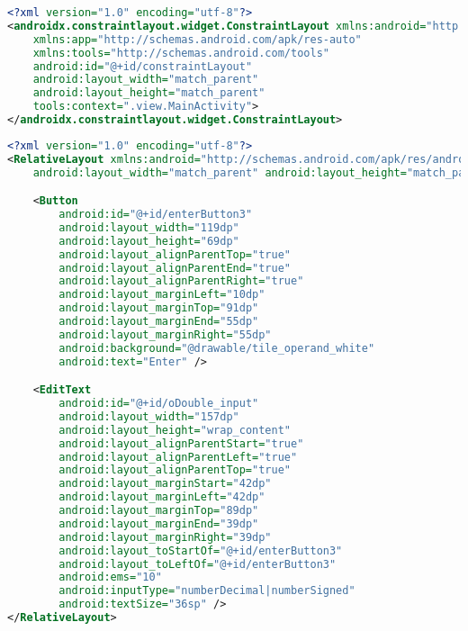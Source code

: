\begin{lstlisting}[caption=activity\_main.xml,label=list:activity_main.xml,language=XML]
<?xml version="1.0" encoding="utf-8"?>
<androidx.constraintlayout.widget.ConstraintLayout xmlns:android="http://schemas.android.com/apk/res/android"
    xmlns:app="http://schemas.android.com/apk/res-auto"
    xmlns:tools="http://schemas.android.com/tools"
    android:id="@+id/constraintLayout"
    android:layout_width="match_parent"
    android:layout_height="match_parent"
    tools:context=".view.MainActivity">
</androidx.constraintlayout.widget.ConstraintLayout>
\end{lstlisting} 

\begin{lstlisting}[caption=input\_double.xml,label=list:input_double.xml,language=XML]
<?xml version="1.0" encoding="utf-8"?>
<RelativeLayout xmlns:android="http://schemas.android.com/apk/res/android"
    android:layout_width="match_parent" android:layout_height="match_parent">

    <Button
        android:id="@+id/enterButton3"
        android:layout_width="119dp"
        android:layout_height="69dp"
        android:layout_alignParentTop="true"
        android:layout_alignParentEnd="true"
        android:layout_alignParentRight="true"
        android:layout_marginLeft="10dp"
        android:layout_marginTop="91dp"
        android:layout_marginEnd="55dp"
        android:layout_marginRight="55dp"
        android:background="@drawable/tile_operand_white"
        android:text="Enter" />

    <EditText
        android:id="@+id/oDouble_input"
        android:layout_width="157dp"
        android:layout_height="wrap_content"
        android:layout_alignParentStart="true"
        android:layout_alignParentLeft="true"
        android:layout_alignParentTop="true"
        android:layout_marginStart="42dp"
        android:layout_marginLeft="42dp"
        android:layout_marginTop="89dp"
        android:layout_marginEnd="39dp"
        android:layout_marginRight="39dp"
        android:layout_toStartOf="@+id/enterButton3"
        android:layout_toLeftOf="@+id/enterButton3"
        android:ems="10"
        android:inputType="numberDecimal|numberSigned"
        android:textSize="36sp" />
</RelativeLayout>
\end{lstlisting}    

